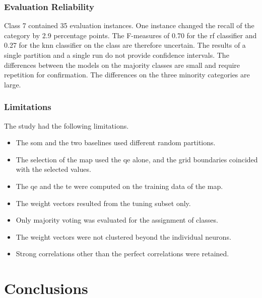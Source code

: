 \documentclass[conference]{IEEEtran}
\begin{document}
\subsubsection{Evaluation Reliability}

Class 7 contained 35 evaluation instances.
One instance changed the recall of the category by 2.9 percentage points.
The F-measures of 0.70 for the \gls{rf} classifier and 0.27 for the \gls{knn} classifier on the class are therefore uncertain.
The results of a single partition and a single run do not provide confidence intervals.
The differences between the models on the majority classes are small and require repetition for confirmation.
The differences on the three minority categories are large.


\subsubsection{Limitations}

The study had the following limitations.

\begin{itemize}
    \item The \gls{som} and the two baselines used different random partitions.
    \item The selection of the map used the \gls{qe} alone, and the grid boundaries coincided with the selected values.
    \item The \gls{qe} and the \gls{te} were computed on the training data of the map.
    \item The weight vectors resulted from the tuning subset only.
    \item Only majority voting was evaluated for the assignment of classes.
    \item The weight vectors were not clustered beyond the individual neurons.
    \item Strong correlations other than the perfect correlations were retained.
\end{itemize}



\section{Conclusions}
\label{sec:conclusions}
\end{document}
